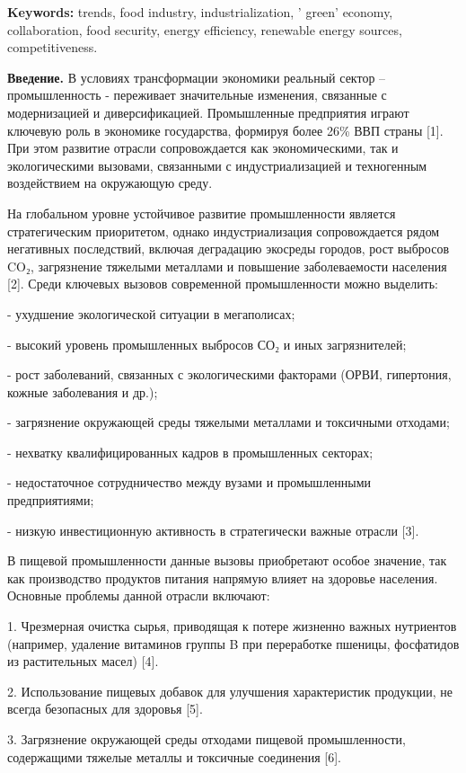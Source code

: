 {\bfseries Keywords:} trends, food industry, industrialization,
' green' economy, collaboration, food
security, energy efficiency, renewable energy sources, competitiveness.

\begin{multicols}{2}
{\bfseries Введение.} В условиях трансформации экономики реальный сектор --
промышленность - переживает значительные изменения, связанные с
модернизацией и диверсификацией. Промышленные предприятия играют
ключевую роль в экономике государства, формируя более 26\% ВВП страны
{[}1{]}. При этом развитие отрасли сопровождается как экономическими,
так и экологическими вызовами, связанными с индустриализацией и
техногенным воздействием на окружающую среду.

На глобальном уровне устойчивое развитие промышленности является
стратегическим приоритетом, однако индустриализация сопровождается рядом
негативных последствий, включая деградацию экосреды городов, рост
выбросов CO₂, загрязнение тяжелыми металлами и повышение заболеваемости
населения {[}2{]}. Среди ключевых вызовов современной промышленности
можно выделить:

- ухудшение экологической ситуации в мегаполисах;

- высокий уровень промышленных выбросов СО₂ и иных загрязнителей;

- рост заболеваний, связанных с экологическими факторами (ОРВИ,
гипертония, кожные заболевания и др.);

- загрязнение окружающей среды тяжелыми металлами и токсичными отходами;

- нехватку квалифицированных кадров в промышленных секторах;

- недостаточное сотрудничество между вузами и промышленными
предприятиями;

- низкую инвестиционную активность в стратегически важные отрасли
{[}3{]}.

В пищевой промышленности данные вызовы приобретают особое значение, так
как производство продуктов питания напрямую влияет на здоровье
населения. Основные проблемы данной отрасли включают:

1. Чрезмерная очистка сырья, приводящая к потере жизненно важных
нутриентов (например, удаление витаминов группы B при переработке
пшеницы, фосфатидов из растительных масел) {[}4{]}.

2. Использование пищевых добавок для улучшения характеристик продукции,
не всегда безопасных для здоровья {[}5{]}.

3. Загрязнение окружающей среды отходами пищевой промышленности,
содержащими тяжелые металлы и токсичные соединения {[}6{]}.


\end{multicols}
